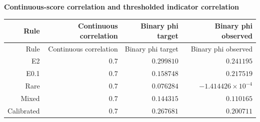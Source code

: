 
\begingroup\small
\setlength{\tabcolsep}{4pt}
\noindent\textbf{Continuous-score correlation and thresholded indicator correlation}
\begin{longtable}{rrrr}
\toprule
Rule & Continuous correlation & Binary phi target & Binary phi observed \\
\midrule
\endfirsthead
Rule & Continuous correlation & Binary phi target & Binary phi observed \\
\midrule
\endhead
\bottomrule
\endfoot
E2 & $0.7$ & $0.299810$ & $0.241195$ \\
E0.1 & $0.7$ & $0.158748$ & $0.217519$ \\
Rare & $0.7$ & $0.076284$ & $-1.414426\times10^{-4}$ \\
Mixed & $0.7$ & $0.144315$ & $0.110165$ \\
Calibrated & $0.7$ & $0.267681$ & $0.200711$ \\
\end{longtable}
\endgroup
